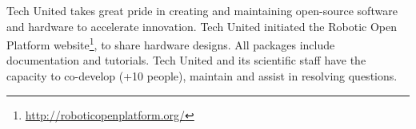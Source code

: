Tech United takes great pride in creating and maintaining open-source software and hardware to accelerate innovation. Tech United initiated the Robotic Open Platform website\footnote{\url{http://roboticopenplatform.org/}}, to share hardware designs. All packages include documentation and tutorials. Tech United and its scientific staff have the capacity to co-develop (+10 people), maintain and assist in resolving questions. 